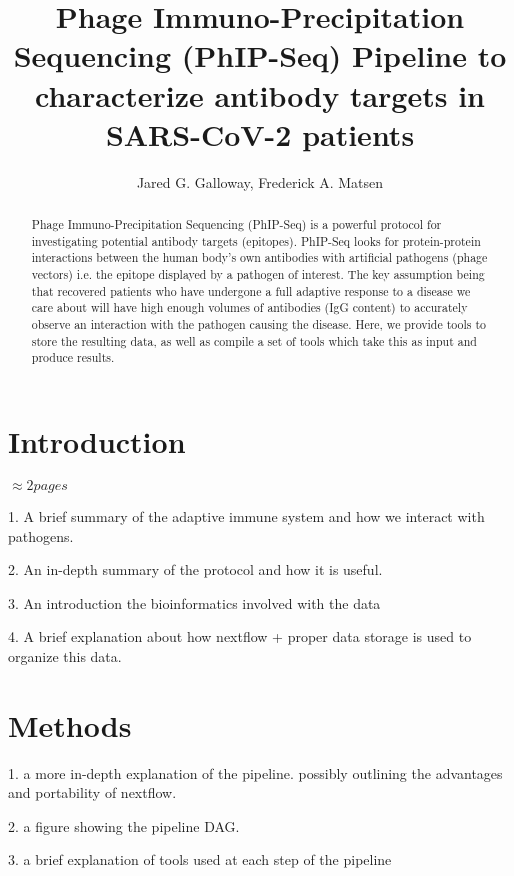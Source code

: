 \documentclass{article}
\title{Phage Immuno-Precipitation Sequencing (PhIP-Seq) Pipeline to characterize antibody targets in SARS-CoV-2 patients}
\author{Jared G. Galloway, Frederick A. Matsen}
\begin{document}
\maketitle

\begin{abstract}
Phage Immuno-Precipitation Sequencing (PhIP-Seq) is a powerful protocol for investigating potential antibody targets (epitopes). 
PhIP-Seq looks for protein-protein interactions between the human body's own antibodies with artificial pathogens (phage vectors) i.e. the epitope displayed by a pathogen of interest. 
The key assumption being that recovered patients who have undergone a full adaptive response to a disease we care about will have high enough volumes of antibodies (IgG content) to accurately observe an interaction with the pathogen causing the disease. 
Here, we provide tools to store the resulting data, as well as compile a set of tools which take this as input and produce results.
\end{abstract}

\section*{Introduction}

$\approx 2 pages$

1. A brief summary of the adaptive immune system and how we interact with pathogens.

2. An in-depth summary of the protocol and how it is useful. 

3. An introduction the bioinformatics involved with the data

4. A brief explanation about how nextflow + proper data storage is used to organize this data.

\section*{Methods}

1. a more in-depth explanation of the pipeline. possibly outlining the advantages and portability of nextflow.

2. a figure showing the pipeline DAG.

3. a brief explanation of tools used at each step of the pipeline

\end{document}
